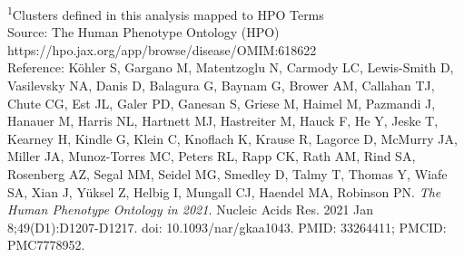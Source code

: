 \documentclass[
  authoryear,
  preprint,
  3p]{elsarticle}
\begin{document}
\begin{minipage}{\linewidth}
\textsuperscript{1}Clusters defined in this analysis mapped to HPO Terms\\
Source: The Human Phenotype Ontology (HPO) https://hpo.jax.org/app/browse/disease/OMIM:618622 \\
Reference: Köhler S, Gargano M, Matentzoglu N, Carmody LC, Lewis-Smith D, Vasilevsky NA, Danis D, Balagura G, Baynam G, Brower AM, Callahan TJ, Chute CG, Est JL, Galer PD, Ganesan S, Griese M, Haimel M, Pazmandi J, Hanauer M, Harris NL, Hartnett MJ, Hastreiter M, Hauck F, He Y, Jeske T, Kearney H, Kindle G, Klein C, Knoflach K, Krause R, Lagorce D, McMurry JA, Miller JA, Munoz-Torres MC, Peters RL, Rapp CK, Rath AM, Rind SA, Rosenberg AZ, Segal MM, Seidel MG, Smedley D, Talmy T, Thomas Y, Wiafe SA, Xian J, Yüksel Z, Helbig I, Mungall CJ, Haendel MA, Robinson PN. \emph{The Human Phenotype Ontology in 2021.} Nucleic Acids Res. 2021 Jan 8;49(D1):D1207-D1217. doi: {10.1093/nar/gkaa1043}. PMID: 33264411; PMCID: PMC7778952.\\
\end{minipage}
\end{document}
